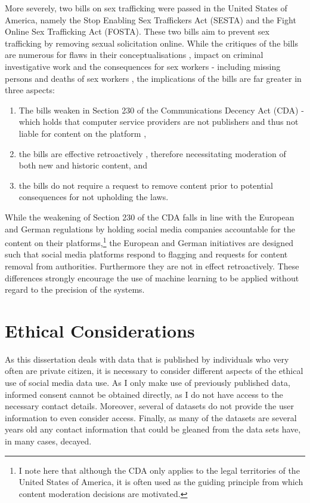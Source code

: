 More severely, two bills on sex trafficking were passed in the United States of America, namely the Stop Enabling Sex Traffickers Act (SESTA) and the Fight Online Sex Trafficking Act (FOSTA).
These two bills aim to prevent sex trafficking by removing sexual solicitation online.
While the critiques of the bills are numerous for flaws in their conceptualisations \citep{Romano:2018}, impact on criminal investigative work \citep{Q:2018} and the consequences for sex workers - including missing persons and deaths of sex workers \citep{Blue:2018,Simon:2018}, the implications of the bills are far greater in three aspects:

\begin{enumerate}
  \item{The bills weaken \citep{Romano:2018,Stryker:2018} in Section 230 of the Communications Decency Act (CDA) - which holds that computer service providers are not publishers and thus not liable for content on the platform \citep{EFF:230},}
  \item{the bills are effective retroactively \citep{Stryker:2018}, therefore necessitating moderation of both new and historic content, and}
  \item{the bills do not require a request to remove content prior to potential consequences for not upholding the laws.}
\end{enumerate}

While the weakening of Section 230 of the CDA falls in line with the European and German regulations by holding social media companies accountable for the content on their platforms,\footnote{I note here that although the CDA only applies to the legal territories of the United States of America, it is often used as the guiding principle from which content moderation decisions are motivated.} the European and German initiatives are designed such that social media platforms respond to flagging and requests for content removal from authorities.
Furthermore they are not in effect retroactively.
These differences strongly encourage the use of machine learning to be applied without regard to the precision of the systems.

\section{Ethical Considerations}

As this dissertation deals with data that is published by individuals who very often are private citizen, it is necessary to consider different aspects of the ethical use of social media data use.
As I only make use of previously published data, informed consent cannot be obtained directly, as I do not have access to the necessary contact details.
Moreover, several of datasets do not provide the user information to even consider access.
Finally, as many of the datasets are several years old any contact information that could be gleaned from the data sets have, in many cases, decayed.

